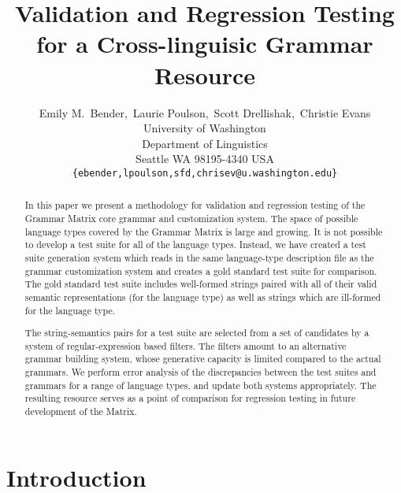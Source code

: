 \documentclass[11pt]{article}
\title{Validation and Regression Testing for a Cross-linguisic Grammar Resource}
\author{Emily M.~Bender,\  Laurie Poulson,\  Scott Drellishak,\ Christie Evans\\
  University of Washington\\
  Department of Linguistics\\
  Seattle WA 98195-4340 USA\\
  {\tt \{ebender,lpoulson,sfd,chrisev@u.washington.edu\}}}
\date{}
\begin{document}
\maketitle
\begin{abstract}
  In this paper we present a methodology for validation and regression
  testing of the Grammar Matrix core grammar and customization system.
  The space of possible language types covered by the Grammar Matrix
  is large and growing. It is not possible to develop a test suite for
  all of the language types.  Instead, we have created a test suite
  generation system which reads in the same language-type description
  file as the grammar customization system and creates a gold standard
  test suite for comparison.  The gold standard test suite includes
  well-formed strings paired with all of their valid semantic
  representations (for the language type) as well as strings which are
  ill-formed for the language type.

  The string-semantics pairs for a test suite are selected from a set
  of candidates by a system of regular-expression based filters.  The
  filters amount to an alternative grammar building system, whose
  generative capacity is limited compared to the actual grammars.  We
  perform error analysis of the discrepancies between the test suites
  and grammars for a range of language types, and update both systems
  appropriately.  The resulting resource serves as a point of
  comparison for regression testing in future development of the
  Matrix.
\end{abstract}


\section{Introduction}
\end{document}
